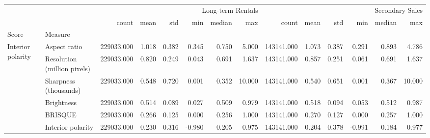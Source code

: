 \begin{tabular}{llrrrrrrrrrrrr}
\toprule
 &  & \multicolumn{6}{r}{Long-term Rentals} & \multicolumn{6}{r}{Secondary Sales} \\
 &  & count & mean & std & min & median & max & count & mean & std & min & median & max \\
Score & Measure &  &  &  &  &  &  &  &  &  &  &  &  \\
\midrule
\multirow[t]{6}{*}{Interior polarity} & Aspect ratio & 229033.000 & 1.018 & 0.382 & 0.345 & 0.750 & 5.000 & 143141.000 & 1.073 & 0.387 & 0.291 & 0.893 & 4.786 \\
 & Resolution (million pixels) & 229033.000 & 0.820 & 0.249 & 0.043 & 0.691 & 1.637 & 143141.000 & 0.857 & 0.251 & 0.061 & 0.691 & 1.637 \\
 & Sharpness (thousands) & 229033.000 & 0.548 & 0.720 & 0.001 & 0.352 & 10.000 & 143141.000 & 0.540 & 0.651 & 0.001 & 0.367 & 10.000 \\
 & Brightness & 229033.000 & 0.514 & 0.089 & 0.027 & 0.509 & 0.979 & 143141.000 & 0.518 & 0.094 & 0.053 & 0.512 & 0.987 \\
 & BRISQUE & 229033.000 & 0.266 & 0.125 & 0.000 & 0.256 & 1.000 & 143141.000 & 0.270 & 0.127 & 0.000 & 0.257 & 1.000 \\
 & Interior polarity & 229033.000 & 0.230 & 0.316 & -0.980 & 0.205 & 0.975 & 143141.000 & 0.204 & 0.378 & -0.991 & 0.184 & 0.977 \\
\cline{1-14}
\bottomrule
\end{tabular}
